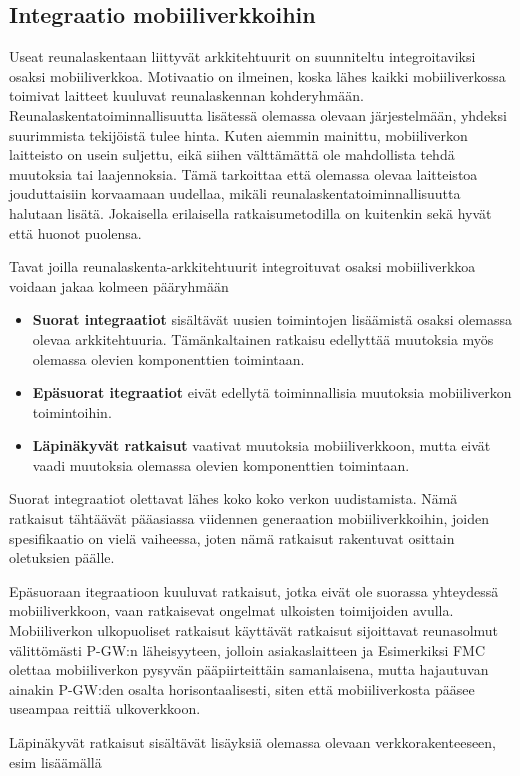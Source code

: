 \subsection{Integraatio mobiiliverkkoihin}

Useat reunalaskentaan liittyvät arkkitehtuurit on suunniteltu integroitaviksi osaksi mobiiliverkkoa.
Motivaatio on ilmeinen, koska lähes kaikki mobiiliverkossa toimivat laitteet kuuluvat reunalaskennan kohderyhmään.
Reunalaskentatoiminnallisuutta lisätessä olemassa olevaan järjestelmään, yhdeksi suurimmista tekijöistä tulee hinta. 
Kuten aiemmin mainittu, mobiiliverkon laitteisto on usein suljettu, eikä siihen välttämättä ole mahdollista tehdä muutoksia tai laajennoksia.
Tämä tarkoittaa että olemassa olevaa laitteistoa jouduttaisiin korvaamaan uudellaa, mikäli reunalaskentatoiminnallisuutta halutaan lisätä. Jokaisella erilaisella ratkaisumetodilla on kuitenkin sekä hyvät että huonot puolensa.

Tavat joilla reunalaskenta-arkkitehtuurit integroituvat osaksi mobiiliverkkoa voidaan jakaa kolmeen pääryhmään

\begin{itemize}
\item \textbf{Suorat integraatiot} sisältävät uusien toimintojen lisäämistä osaksi olemassa olevaa arkkitehtuuria. Tämänkaltainen ratkaisu edellyttää muutoksia myös olemassa olevien komponenttien toimintaan. 
\item \textbf{Epäsuorat itegraatiot} eivät edellytä toiminnallisia muutoksia mobiiliverkon toimintoihin.
\item \textbf{Läpinäkyvät ratkaisut} vaativat muutoksia mobiiliverkkoon, mutta eivät vaadi muutoksia olemassa olevien komponenttien toimintaan.
\end{itemize}

Suorat integraatiot olettavat lähes koko koko verkon uudistamista. Nämä ratkaisut tähtäävät pääasiassa viidennen generaation mobiiliverkkoihin, joiden spesifikaatio on vielä vaiheessa, joten nämä ratkaisut rakentuvat osittain oletuksien päälle. 

Epäsuoraan itegraatioon kuuluvat ratkaisut, jotka eivät ole suorassa yhteydessä mobiiliverkkoon, vaan ratkaisevat ongelmat ulkoisten toimijoiden avulla. Mobiiliverkon ulkopuoliset ratkaisut käyttävät ratkaisut sijoittavat reunasolmut välittömästi P-GW:n läheisyyteen, jolloin asiakaslaitteen ja  Esimerkiksi FMC olettaa mobiiliverkon pysyvän pääpiirteittäin samanlaisena, mutta hajautuvan ainakin P-GW:den osalta horisontaalisesti, siten että mobiiliverkosta pääsee useampaa reittiä ulkoverkkoon.

Läpinäkyvät ratkaisut sisältävät lisäyksiä olemassa olevaan verkkorakenteeseen, esim lisäämällä 